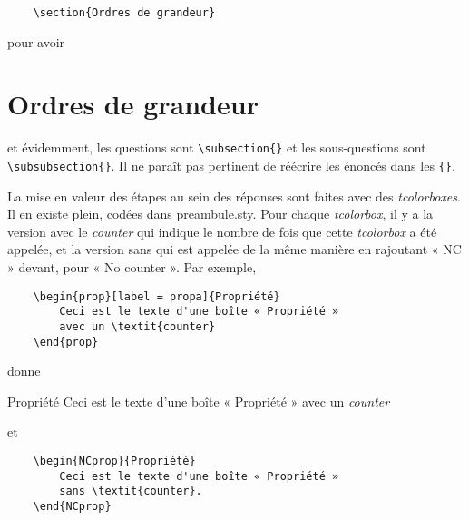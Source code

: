 \documentclass[10pt,a5paper,notitlepage]{book}
\begin{document}
\begin{verbatim}
    \section{Ordres de grandeur}
\end{verbatim}

pour avoir

\section{Ordres de grandeur}

et évidemment, les questions sont \verb=\subsection{}= et les sous-questions
sont \verb=\subsubsection{}=. Il ne paraît pas pertinent de réécrire les
énoncés dans les \verb={}=.

La mise en valeur des étapes au sein des réponses sont faites avec des
\textit{tcolorboxes}. Il en existe plein, codées dans preambule.sty. Pour chaque
\textit{tcolorbox}, il y a la version avec le \textit{counter} qui indique le
nombre de fois que cette \textit{tcolorbox} a été appelée, et la version sans
qui est appelée de la même manière en rajoutant « NC » devant, pour « No counter
».  Par exemple,

\begin{verbatim}
    \begin{prop}[label = propa]{Propriété}
        Ceci est le texte d'une boîte « Propriété »
        avec un \textit{counter}
    \end{prop}
\end{verbatim}

donne

\begin{prop}[label = propa]{Propriété}
    Ceci est le texte d'une boîte « Propriété » avec un \textit{counter}
\end{prop}

et

\begin{verbatim}
    \begin{NCprop}{Propriété}
        Ceci est le texte d'une boîte « Propriété »
        sans \textit{counter}.
    \end{NCprop}
\end{verbatim}
\end{document}
